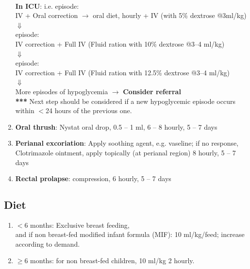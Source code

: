 \documentclass[11pt,a4paper]{report}
\begin{document}
\begin{enumerate}
	~\\
	\textbf{In ICU}: 
	\noindent i.e.  episode: \\
	IV + Oral correction $\rightarrow$  oral diet, hourly +  IV (with 5\% dextrose @3ml/kg) \\
	$\Downarrow$ \\
	\noindent {} episode: \\
	IV correction + Full IV (Fluid ration with 10\% dextrose @3--4 ml/kg) \\
	$\Downarrow$ \\
	\noindent {} episode: \\
	IV correction + Full IV (Fluid ration with 12.5\% dextrose @3--4 ml/kg) \\
	$\Downarrow$ \\
	\noindent More episodes of hypoglycemia $\rightarrow$ {\color{red}\textbf{Consider referral}} \\
	\textbf{***} Next step should be considered if a new hypoglycemic episode occurs within $<$24 hours of the previous one. \\
	\item \textbf{Oral thrush}: Nystat oral drop, 0.5 -- 1 ml, 6 -- 8 hourly, 5 -- 7 days 
	\item \textbf{Perianal excoriation}: Apply soothing agent, e.g. vaseline; if no response, Clotrimazole ointment, apply topically (at perianal region) 8 hourly, 5 -- 7 days
	\item \textbf{Rectal prolapse}:  compression, 6 hourly, 5 -- 7 days
\end{enumerate}


\subsection{Diet}
\begin{enumerate}
	\item $<$6 months: Exclusive breast feeding, \\
	and if non breast-fed modified infant formula (MIF): 10 ml/kg/feed; increase according to demand.
	\item $\geq$6 months: 
	for non breast-fed children, 10 ml/kg 2 hourly.
\end{enumerate}
\end{document}
